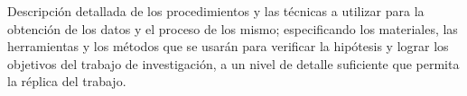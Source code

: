Descripción detallada de los procedimientos y las técnicas a utilizar para la obtención de los datos y el proceso de los mismo; especificando los materiales, las herramientas y los métodos que se usarán para verificar la hipótesis y lograr los objetivos del trabajo de investigación, a un nivel de detalle suficiente que permita la réplica del trabajo.
